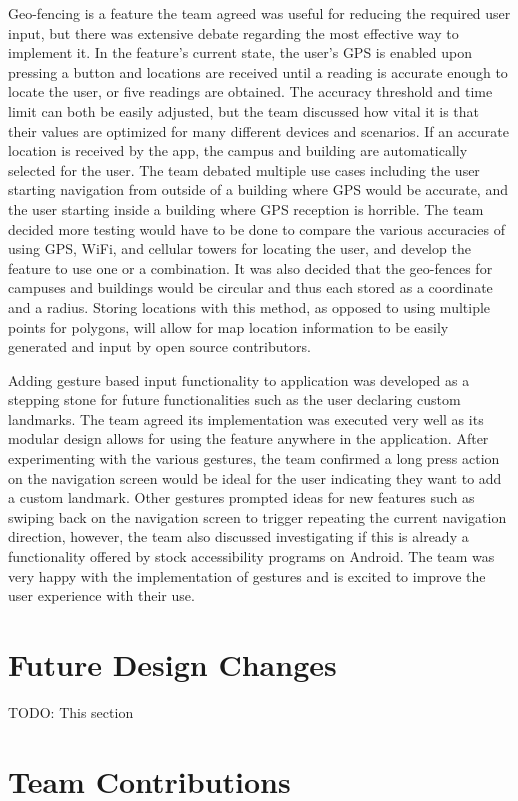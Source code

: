 \documentclass{scrreprt}
\begin{document}
Geo-fencing is a feature the team agreed was useful for reducing the required user input, but there was extensive debate regarding the most effective way to implement it. In the feature’s current state, the user's GPS is enabled upon pressing a button and locations are received until a reading is accurate enough to locate the user, or five readings are obtained. The accuracy threshold and time limit can both be easily adjusted, but the team discussed how vital it is that their values are optimized for many different devices and scenarios. If an accurate location is received by the app, the campus and building are automatically selected for the user. The team debated multiple use cases including the user starting navigation from outside of a building where GPS would be accurate, and the user starting inside a building where GPS reception is horrible. The team decided more testing would have to be done to compare the various accuracies of using GPS, WiFi, and cellular towers for locating the user, and develop the feature to use one or a combination. It was also decided that the geo-fences for campuses and buildings would be circular and thus each stored as a coordinate and a radius. Storing locations with this method, as opposed to using multiple points for polygons, will allow for map location information to be easily generated and input by open source contributors.

Adding gesture based input functionality to application was developed as a stepping stone for future functionalities such as the user declaring custom landmarks. The team agreed its implementation was executed very well as its modular design allows for using the feature anywhere in the application. After experimenting with the various gestures, the team confirmed a long press action on the navigation screen would be ideal for the user indicating they want to add a custom landmark. Other gestures prompted ideas for new features such as swiping back on the navigation screen to trigger repeating the current navigation direction, however, the team also discussed investigating if this is already a functionality offered by stock accessibility programs on Android. The team was very happy with the implementation of gestures and is excited to improve the user experience with their use.

\chapter{Future Design Changes}
TODO: This section
\chapter{Team Contributions}
\end{document}
